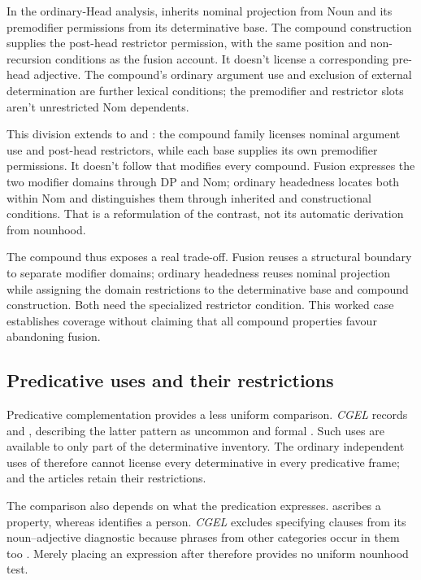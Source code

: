 \documentclass[12pt]{article}
\begin{document}
In the ordinary-Head analysis,  inherits nominal projection from Noun and its premodifier permissions from its determinative base. The compound construction supplies the post-head restrictor permission, with the same position and non-recursion conditions as the fusion account. It doesn't license a corresponding pre-head adjective. The compound's ordinary argument use and exclusion of external determination are further lexical conditions; the premodifier and restrictor slots aren't unrestricted Nom dependents.

This division extends to  and : the compound family licenses nominal argument use and post-head restrictors, while each base supplies its own premodifier permissions. It doesn't follow that  modifies every compound. Fusion expresses the two modifier domains through DP and Nom; ordinary headedness locates both within Nom and distinguishes them through inherited and constructional conditions. That is a reformulation of the contrast, not its automatic derivation from nounhood.

The compound thus exposes a real trade-off. Fusion reuses a structural boundary to separate modifier domains; ordinary headedness reuses nominal projection while assigning the domain restrictions to the determinative base and compound construction. Both need the specialized restrictor condition. This worked case establishes coverage without claiming that all compound properties favour abandoning fusion.

\subsection{Predicative uses and their restrictions}\label{sec:predication}

Predicative complementation provides a less uniform comparison. \textit{CGEL} records  and , describing the latter pattern as uncommon and formal \citep[392, 395--396]{huddleston2002}. Such uses are available to only part of the determinative inventory. The ordinary independent uses of  therefore cannot license every determinative in every predicative frame;  and the articles retain their restrictions.

The comparison also depends on what the predication expresses.  ascribes a property, whereas  identifies a person. \textit{CGEL} excludes specifying  clauses from its noun--adjective diagnostic because phrases from other categories occur in them too \citep[536]{huddleston2002}. Merely placing an expression after  therefore provides no uniform nounhood test.
\end{document}
